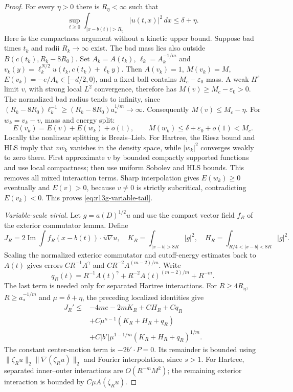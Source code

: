 \begin{proof}
For every $\eta>0$ there is $R_\eta<\infty$ such that
\begin{equation}\label{eq:r13g-variable-tail}
 \sup_{t\ge0}\int_{|x-b(t)|>R_\eta}|u(t,x)|^2\,dx
 \le\delta+\eta.
\end{equation}
Here is the compactness argument without a kinetic upper bound.
Suppose bad times $t_k$ and radii $R_k\to\infty$ exist. The bad mass
lies also outside $B(c(t_k),R_k-8R_0)$. Set $A_k=A(t_k)$,
$\ell_k=A_k^{-1/m}$ and
$v_k(y)=\ell_k^{N/2}u(t_k,c(t_k)+\ell_k y)$.
Then $A(v_k)=1$, $M(v_k)=M$, $E(v_k)=-e/A_k\in[-d/2,0)$,
and a fixed ball contains $M_c-\varepsilon_0$ mass.
A weak $H^s$ limit $v$, with strong local $L^2$ convergence, therefore
has $M(v)\ge M_c-\varepsilon_0>0$. The normalized bad radius tends
to infinity, since
$(R_k-8R_0)\ell_k^{-1}\ge(R_k-8R_0)a_*^{1/m}\to\infty$.
Consequently $M(v)\le M_c-\eta$.
For $w_k=v_k-v$, mass and energy split:
\[
 E(v_k)=E(v)+E(w_k)+o(1),\qquad
 M(w_k)\le\delta+\varepsilon_0+o(1)<M_c.
\]
Locally the nonlinear splitting is Brezis--Lieb. For Hartree, the
Riesz bound and HLS imply that $v\overline{w_k}$ vanishes in the
density space, while $|w_k|^2$ converges weakly to zero there. First
approximate $v$ by bounded compactly supported functions and use local
compactness; then use uniform Sobolev and HLS bounds. This removes all
mixed interaction terms. Sharp interpolation gives $E(w_k)\ge0$
eventually and $E(v)>0$, because $v\ne0$ is strictly subcritical,
contradicting $E(v_k)<0$. This proves \eqref{eq:r13g-variable-tail}.

\medskip\noindent\emph{Variable-scale virial.}
Let $g=a(D)^{1/2}u$ and use the compact vector field $f_R$ of the
exterior commutator lemma. Define
\[
 J_R=2\operatorname{Im}\int f_R(x-b(t))\cdot\overline u\nabla u,
 \quad K_R=\int_{|x-b|>8R}|g|^2,
 \quad H_R=\int_{R/4<|x-b|<8R}|g|^2.
\]
Scaling the normalized exterior commutator and cutoff-energy estimates
back to $A(t)$ gives errors $CR^{-1}A^\gamma$ and
$CR^{-2}A^{(m-2)/m}$. Write
\[
 q_R(t)=R^{-1}A(t)^\gamma+R^{-2}A(t)^{(m-2)/m}+R^{-m}.
\]
The last term is needed only for separated Hartree interactions.
For $R\ge4R_\eta$, $R\ge a_*^{-1/m}$ and $\mu=\delta+\eta$,
the preceding localized identities give
\begin{align*}
 J_R'\le{}&-4me-2mK_R+CH_R+Cq_R\\
 &+C\mu^{\kappa-1}(K_R+H_R+q_R)\\
 &+C|b'|\mu^{1-1/m}(K_R+H_R+q_R)^{1/m}.
\end{align*}
The constant center-motion term is $-2b'\cdot P=0$. Its remainder is
bounded using $\|\zeta_Ru\|_2\|\nabla(\zeta_Ru)\|_2$ and Fourier
interpolation, since $s>1$. For Hartree, separated inner--outer
interactions are $O(R^{-m}M^2)$; the remaining exterior interaction
is bounded by $C\mu A(\zeta_Ru)$.


\end{proof}
